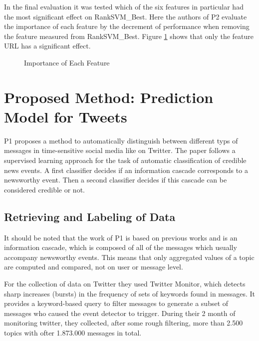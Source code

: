 \documentclass{proseminar}
\begin{document}
In the final evaluation it was tested which of the six features in particular had the most significant effect on RankSVM\_Best. Here the authors of P2 evaluate the importance of each feature by the decrement of performance when removing the feature measured from RankSVM\_Best. 
Figure \ref{fig:p2_resultFeature} shows that only the feature URL has a significant effect.

\begin{figure}[h]
\centering
{}
\caption{Importance of Each Feature}
\label{fig:p2_resultFeature}
\end{figure}



\section{Proposed Method: Prediction\\ Model for Tweets}
P1 proposes a method to automatically distinguish between different typs of messages in time-sensitive social media like on Twitter.
The paper follows a supervised learning approach for the task of automatic classification of credible news events. A first classifier decides if an information cascade corresponds to a newsworthy event. Then a second classifier decides if this cascade can be considered credible or not.


\subsection{Retrieving and Labeling of Data}
It should be noted that the work of P1 is based on previous works and is an information cascade, which is composed of all of the messages which usually accompany newsworthy events. This means that only aggregated values of a topic are computed and compared, not on user or message level.

For the collection of data on Twitter they used Twitter Monitor\cite{twittermonitor}, which detects sharp increases (bursts) in the frequency of sets of keywords found in messages. It provides a keyword-based query to filter messages to generate a subset of messages who caused the event detector to trigger.
During their 2 month of monitoring twitter, they collected, after some rough filtering, more than 2.500 topics with ofter 1.873.000 messages in total.
\end{document}
